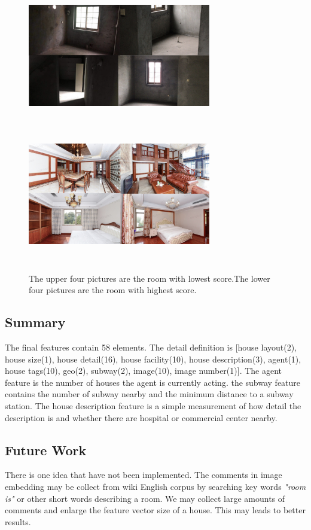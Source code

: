\documentclass[final]{cvpr}
\begin{document}
\begin{figure}[h]
\centering
\includegraphics[width=8cm,height=6cm]{p2.jpeg}
\includegraphics[width=8cm,height=6cm]{p3.jpeg}
\caption{The upper four pictures are the room with lowest score.The lower four pictures are the room with highest score.}
\end{figure}

\subsection{Summary}
The final features contain 58 elements. The detail definition is [house layout(2), house size(1), house detail(16), house facility(10), house description(3), agent(1), house tags(10), geo(2), subway(2), image(10), image number(1)]. The agent feature is the number of houses the agent is currently acting. the subway feature contains the number of subway nearby and the minimum distance to a subway station. The house description feature is a simple measurement of how detail the description is and whether there are hospital or commercial center nearby.
\subsection{Future Work}
There is one idea that have not been implemented. The comments in image embedding may be collect from wiki English corpus by searching key words \textit{"room is"} or other short words describing a room. We may collect large amounts of comments and enlarge the feature vector size of a house. This may leads to better results.
\end{document}

